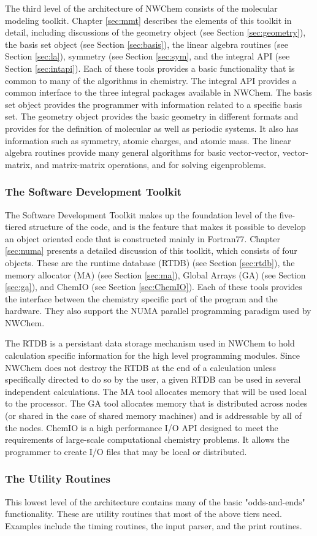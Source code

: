 The third level of the architecture of NWChem consists of
the molecular modeling toolkit.  Chapter \ref{sec:mmt} describes the
elements of this toolkit in detail,  including discussions of 
the geometry object (see Section \ref{sec:geometry}), 
the basis set object (see Section \ref{sec:basis}), the
linear algebra routines (see Section \ref{sec:la}), 
symmetry (see Section \ref{sec:sym}, and
the integral API (see Section
\ref{sec:intapi}).  Each of these 
tools provides a basic functionality that is common to many of the
algorithms in chemistry.  The integral API provides a common interface to
the three integral packages available in NWChem.  The basis set object
provides the programmer with information related to a specific basis
set.  The geometry object provides the basic geometry in different
formats and provides for the definition of molecular as well as periodic
systems.  It also has information such as symmetry, atomic charges, and
atomic mass.  The linear algebra routines provide many general 
algorithms for basic vector-vector, vector-matrix, and matrix-matrix
operations, and for solving
eigenproblems.

\subsubsection{The Software Development Toolkit}

The Software Development Toolkit
makes up the foundation level of the five-tiered
structure of the code, and is the feature that makes it possible
to develop an object oriented code that is constructed mainly
in Fortran77.  Chapter \ref{sec:numa} presents a detailed discussion
of this toolkit, which consists of four objects.
These are the runtime database (RTDB) (see Section
\ref{sec:rtdb}), the memory allocator (MA) (see Section \ref{sec:ma}),
Global Arrays (GA) (see Section \ref{sec:ga}), and ChemIO 
(see Section \ref{sec:ChemIO}).  Each of these tools provides the
interface between the chemistry specific part of the program and the
hardware.  They also support the NUMA parallel programming
paradigm used by NWChem.

The RTDB is a persistant data storage mechanism used in NWChem
to hold calculation specific information for the high level
programming modules.  Since NWChem does not destroy the RTDB at the end of
a calculation unless specifically directed to do so by the user, 
a given RTDB can be used in several independent
calculations.  The MA tool allocates memory that will be used local to
the processor.  The GA tool allocates memory that is distributed across
nodes (or shared in the case of shared memory machines) and is addressable
by all of the nodes.  ChemIO is a high performance I/O API 
designed to meet the requirements of large-scale computational
chemistry problems.  It allows the programmer to 
create I/O files that may be local or distributed.

\subsubsection{The Utility Routines}

This lowest level of the architecture contains many of the basic 
"odds-and-ends" functionality.
These are utility routines that most of the
above tiers need.
Examples include the timing routines,
the input parser, 
and the print routines.

